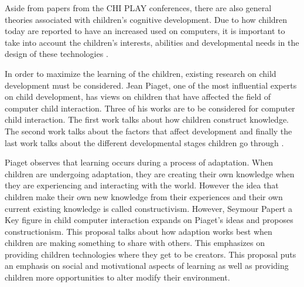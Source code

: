 Aside from papers from the CHI PLAY conferences, there are also general theories associated with children's cognitive development. Due to how children today are reported to have an increased used on computers, it is important to take into account the children's interests, abilities and developmental needs in the design of these technologies \cite{hourcade2008interaction}.

In order to maximize the learning of the children, existing research on child development must be considered. Jean Piaget, one of the most influential experts on child development, has views on children that have affected the field of computer child interaction. Three of his works are to be considered for computer child interaction. The first work talks about how children construct knowledge. The second work talks about the factors that affect development and finally the last work talks about the different developmental stages children go through \cite{hourcade2015child}.

Piaget observes that learning occurs during a process of adaptation. When children are undergoing adaptation, they are creating their own knowledge when they are experiencing and interacting with the world. However the idea that children make their own new knowledge from their experiences and their own current existing knowledge is called constructivism. However, Seymour Papert a Key figure in child computer interaction expands on Piaget's ideas and proposes constructionism. This proposal talks about how adaption works best when children are making something to share with others. This emphasizes on providing children technologies where they get to be creators. This proposal puts an emphasis on social and motivational aspects of learning as well as providing children more opportunities to alter modify their environment.

